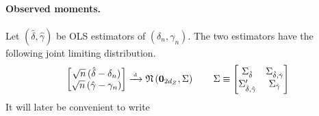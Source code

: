 \paragraph*{Observed moments.}
Let \((\hat \delta,\hat \gamma)\) be OLS estimators of \((\delta_n,\gamma_n)\). The two estimators have the following joint limiting distribution.
\begin{align}
    \begin{bmatrix}
        \sqrt{n}\,(\hat \delta - \delta_n) \\
        \sqrt{n}\,(\hat \gamma - \gamma_n) \\
    \end{bmatrix}
    \xrightarrow{{\scriptscriptstyle \mathrm{\;d\;}}} 
    \mathfrak{N}\left(\mathbf{0}_{2d_Z},\Sigma\right) 
    \qquad 
    \Sigma   \equiv 
   \begin{bmatrix}
       \Sigma_{\hat \delta} & \Sigma_{\hat \delta,\hat \gamma} \\ 
       \Sigma_{\hat \delta,\hat \gamma}' & \Sigma_{\hat \gamma}
   \end{bmatrix}
\end{align}
It will later be convenient to write
